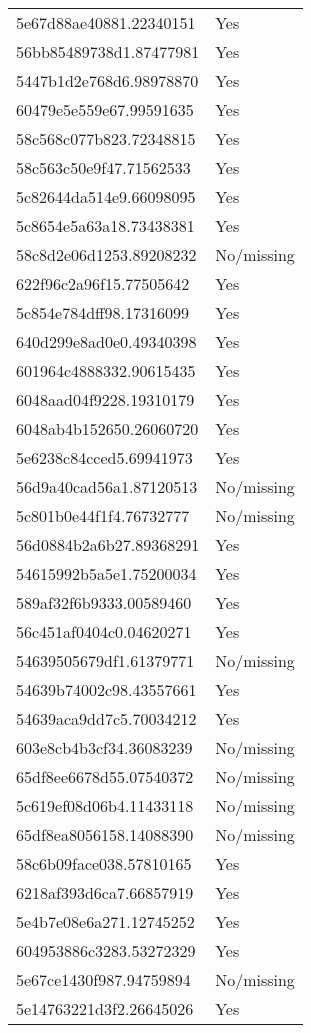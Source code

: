 \begin{tabular}{ll}
5e67d88ae40881.22340151 & Yes \\
56bb85489738d1.87477981 & Yes \\
5447b1d2e768d6.98978870 & Yes \\
60479e5e559e67.99591635 & Yes \\
58c568c077b823.72348815 & Yes \\
58c563c50e9f47.71562533 & Yes \\
5c82644da514e9.66098095 & Yes \\
5c8654e5a63a18.73438381 & Yes \\
58c8d2e06d1253.89208232 & No/missing \\
622f96c2a96f15.77505642 & Yes \\
5c854e784dff98.17316099 & Yes \\
640d299e8ad0e0.49340398 & Yes \\
601964c4888332.90615435 & Yes \\
6048aad04f9228.19310179 & Yes \\
6048ab4b152650.26060720 & Yes \\
5e6238c84cced5.69941973 & Yes \\
56d9a40cad56a1.87120513 & No/missing \\
5c801b0e44f1f4.76732777 & No/missing \\
56d0884b2a6b27.89368291 & Yes \\
54615992b5a5e1.75200034 & Yes \\
589af32f6b9333.00589460 & Yes \\
56c451af0404c0.04620271 & Yes \\
54639505679df1.61379771 & No/missing \\
54639b74002c98.43557661 & Yes \\
54639aca9dd7c5.70034212 & Yes \\
603e8cb4b3cf34.36083239 & No/missing \\
65df8ee6678d55.07540372 & No/missing \\
5c619ef08d06b4.11433118 & No/missing \\
65df8ea8056158.14088390 & No/missing \\
58c6b09face038.57810165 & Yes \\
6218af393d6ca7.66857919 & Yes \\
5e4b7e08e6a271.12745252 & Yes \\
604953886c3283.53272329 & Yes \\
5e67ce1430f987.94759894 & No/missing \\
5e14763221d3f2.26645026 & Yes \\

\end{tabular}
